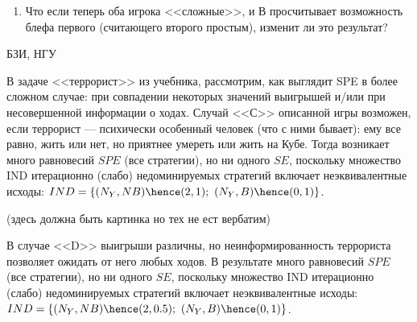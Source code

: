 \begin{problem}
\begin{enumerate}
\item Что если теперь оба игрока <<сложные>>, и В просчитывает
возможность блефа первого (считающего второго простым),
изменит ли это результат?
\end{enumerate}





\begin{sol}

\end{sol}
\end{problem}




\begin{problem}
\begin{source}
БЗИ, НГУ
\end{source}
 {\rm В задаче <<террорист>> из учебника,
рассмотрим, как выглядит SPE в более сложном случае: при
совпадении некоторых значений выигрышей и/или при
несовершенной информации о ходах. Случай <<С>> описанной
игры возможен, если террорист --- психически особенный
человек (что с ними бывает): ему все равно, жить или нет,
но приятнее умереть или жить на Кубе. Тогда возникает много
равновесий $SPE$ (все стратегии), но ни одного $SE$,
поскольку множество IND итерационно (слабо) недоминируемых
стратегий включает неэквивалентные исходы: $IND=\{
(N_Y,NB)\hence (2,1);~ (N_Y,B)\hence (0,1)\}$.

(здесь должна быть картинка но тех не ест вербатим)



В случае <<D>> выигрыши различны, но неинформированность
террориста позволяет ожидать от него любых ходов. В
результате много равновесий $SPE$ (все стратегии), но ни
одного $SE$, поскольку множество IND итерационно (слабо)
недоминируемых стратегий включает неэквивалентные исходы:
$IND=\{ (N_Y,NB)\hence (2,0.5);~ (N_Y,B)\hence (0,1)\}$.}






\begin{sol}

\end{sol}
\end{problem}
